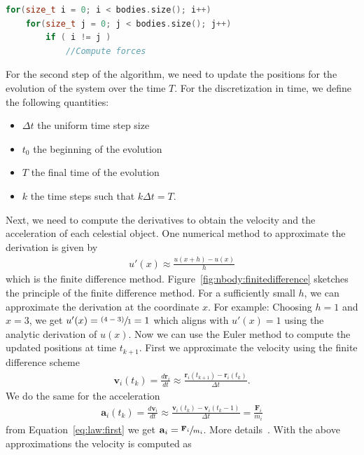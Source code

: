 \begin{lstlisting}[language=c++,caption={Example for the direct sum\index{direct sum}.\label{code:directsum}},float,floatplacement=tb]
for(size_t i = 0; i < bodies.size(); i++)
	for(size_t j = 0; j < bodies.size(); j++)
		if ( i != j )
			//Compute forces
\end{lstlisting}

For the second step of the algorithm, we need to update the positions for the evolution of the system over the time $T$. For the discretization in time, we define the following quantities:
\begin{itemize}
\item $\Delta t$ the uniform time step size
\item $t_0$ the beginning of the evolution
\item $T$ the final time of the evolution
\item $k$ the time steps such that $k\Delta t=T$.
\end{itemize}
Next, we need to compute the derivatives to obtain the velocity and the acceleration of each celestial object. One numerical method to approximate the derivation is given by
\begin{align}
u'(x) \approx \frac{u(x+h)-u(x)}{h}
\end{align}
which is the finite difference method. Figure~\ref{fig:nbody:finitedifference} sketches the principle of the finite difference method. For a sufficiently small $h$, we can approximate the derivation at the coordinate $x$. For example: Choosing $h=1$ and $x=3$, we get $u'(x)=\sfrac{(4-3)}{1}=1$ which aligns with $u'(x)=1$ using the analytic derivation of $u(x)$. Now we can use the Euler method to compute the updated positions at time $t_{k+1}$. First we approximate the velocity using the finite difference scheme
\begin{align}
\mathbf{v}_i(t_k) = \frac{d\mathbf{r}_i}{dt} \approx \frac{\mathbf{r}_i(t_{k+1})-\mathbf{r}_i(t_k)}{\Delta t}\label{eq:vel}\text{.}
\end{align}
We do the same for the acceleration
\begin{align}
\mathbf{a}_i(t_k) = \frac{d\mathbf{v}_i}{dt}   \approx  \frac{\mathbf{v}_i(t_k)-\mathbf{v}_i(t_k-1)}{\Delta t} = \frac{\mathbf{F}_i}{m_i}  \label{eq:acc} 
\end{align}
from Equation~\ref{eq:law:first} we get $\mathbf{a}_i=\sfrac{\mathbf{F}_i}{m_i}$. More details~\cite{strikwerda2004finite,leveque2007finite,euler1824institutionum}. With the above approximations the velocity is computed as
